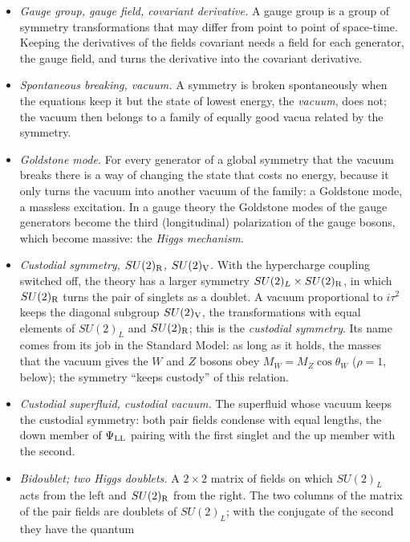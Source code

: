 \documentclass[
  10pt,
]{article}
\providecommand{\tightlist}{%
  \setlength{\itemsep}{0pt}\setlength{\parskip}{0pt}}
\begin{document}
\begin{itemize}
\tightlist
\item
  \emph{Gauge group, gauge field, covariant derivative.} A gauge group
  is a group of symmetry transformations that may differ from point to
  point of space-time. Keeping the derivatives of the fields covariant
  needs a field for each generator, the gauge field, and turns the
  derivative into the covariant derivative.
\item
  \emph{Spontaneous breaking, vacuum.} A symmetry is broken
  spontaneously when the equations keep it but the state of lowest
  energy, the \emph{vacuum}, does not; the vacuum then belongs to a
  family of equally good vacua related by the symmetry.
\item
  \emph{Goldstone mode.} For every generator of a global symmetry that
  the vacuum breaks there is a way of changing the state that costs no
  energy, because it only turns the vacuum into another vacuum of the
  family: a Goldstone mode, a massless excitation. In a gauge theory the
  Goldstone modes of the gauge generators become the third
  (longitudinal) polarization of the gauge bosons, which become massive:
  the \emph{Higgs mechanism}.
\item
  \emph{Custodial symmetry, \(SU(2)_{\rm R}\), \(SU(2)_{\rm V}\).} With
  the hypercharge coupling switched off, the theory has a larger
  symmetry \(SU(2)_L\times SU(2)_{\rm R}\), in which \(SU(2)_{\rm R}\)
  turns the pair of singlets as a doublet. A vacuum proportional to
  \(i\tau^2\) keeps the diagonal subgroup \(SU(2)_{\rm V}\), the
  transformations with equal elements of \(SU(2)_L\) and
  \(SU(2)_{\rm R}\); this is the \emph{custodial symmetry}. Its name
  comes from its job in the Standard Model: as long as it holds, the
  masses that the vacuum gives the \(W\) and \(Z\) bosons obey
  \(M_W=M_Z\cos\theta_W\) (\(\rho=1\), below); the symmetry ``keeps
  custody'' of this relation.
\item
  \emph{Custodial superfluid, custodial vacuum.} The superfluid whose
  vacuum keeps the custodial symmetry: both pair fields condense with
  equal lengths, the down member of \(\Psi_{\rm LL}\) pairing with the
  first singlet and the up member with the second.
\item
  \emph{Bidoublet; two Higgs doublets.} A \(2\times2\) matrix of fields
  on which \(SU(2)_L\) acts from the left and \(SU(2)_{\rm R}\) from the
  right. The two columns of the matrix of the pair fields are doublets
  of \(SU(2)_L\); with the conjugate of the second they have the quantum

\end{itemize}
\end{document}
